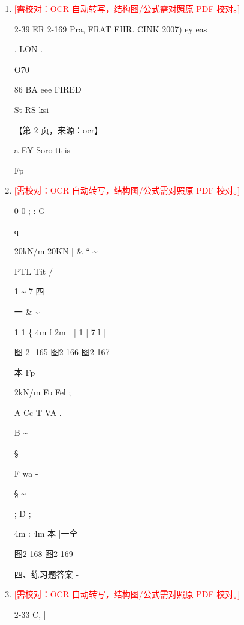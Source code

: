 \documentclass[UTF8,12pt,a4paper,openany]{ctexbook}
\newcommand{\TODO}[1]{\textcolor{red}{[需校对：#1]}}
\begin{document}
\begin{enumerate}[label=\textbf{\arabic*.},leftmargin=2em]
\item \TODO{OCR 自动转写，结构图/公式需对照原 PDF 校对。}\par 2-39 ER 2-169 Pra, FRAT EHR. CINK 2007)  ey    eas\par .                                    LON   .\par O70\par 86                                                          BA eee FIRED\par St-RS ksi\par \par 【第 2 页，来源：ocr】\par a EY Soro tt is\par Fp
\item \TODO{OCR 自动转写，结构图/公式需对照原 PDF 校对。}\par 0-0          ;           :           G\par q\par 20kN/m    20KN | \&                   “      \textasciitilde{}\par PTL Tit                       /\par 1            \textasciitilde{}                       7                    四\par 一          \&                              \textasciitilde{}\par 1     1    \{     4m    f 2m |         |    1   |    7   l   |\par 图 2- 165                 图2-166           图2-167\par 本    Fp\par 2kN/m                Fo    Fel      ;\par A                 Cc        T       VA      .\par B                            \textasciitilde{}\par §\par F                        wa          -\par §                                        \textasciitilde{}\par ;                               D     ;\par 4m  :   4m       本     |一全\par 图2-168          图2-169\par 四、练习题答案                  -
\item \TODO{OCR 自动转写，结构图/公式需对照原 PDF 校对。}\par 2-33 C,                                                    |

\end{enumerate}
\end{document}
